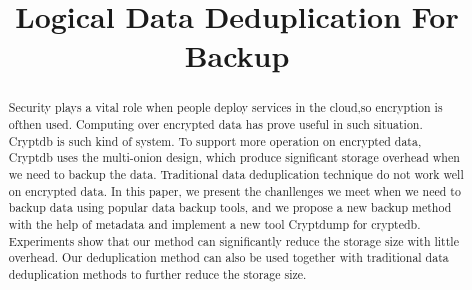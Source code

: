 \documentclass[sigconf]{acmart}
\begin{document}
\title{Logical Data Deduplication For Backup}






\begin{abstract}

Security plays a vital role when people deploy services in the cloud,so encryption is ofthen used. Computing over encrypted data has prove useful in such situation. Cryptdb\citep{popa2011cryptdb} is such kind of system. To support more operation on encrypted data, Cryptdb uses the multi-onion design, which produce significant storage overhead when we need to backup the data. Traditional data deduplication technique do not work well on encrypted data. In this paper, we present the chanllenges we meet when we need to backup data using popular data backup tools, and we propose a new backup method with the help of metadata and implement a new tool Cryptdump for cryptedb. Experiments show that our method can  significantly reduce the storage size with little overhead. Our deduplication method can also be used together with traditional data deduplication methods to further reduce the storage size.


\end{abstract}



\maketitle












 
\end{document}
